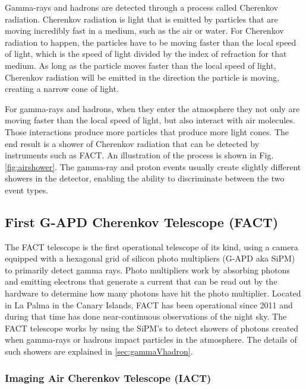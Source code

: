 \documentclass[12pt]{article}
\begin{document}
Gamma-rays and hadrons are detected through a process called Cherenkov radiation. Cherenkov radiation is light that is emitted by particles that are moving incredibly fast in a medium, such as the air or water. For Cherenkov radiation to happen, the particles have to be moving faster than the local speed of light, which is the speed of light divided by the index of refraction for that medium. As long as the particle moves faster than the local speed of light, Cherenkov radiation will be emitted in the direction the particle is moving, creating a narrow cone of light.

For gamma-rays and hadrons, when they enter the atmosphere they not only are moving faster than the local speed of light, but also interact with air molecules. Those interactions produce more particles that produce more light cones. The end result is a shower of Cherenkov radiation that can be detected by instruments such as FACT. An illustration of the process is shown in Fig. \ref{fig:airshower}. The gamma-ray and proton events usually create slightly different showers in the detector, enabling the ability to discriminate between the two event types. 



\subsection{First G-APD Cherenkov Telescope (FACT)}\label{sec:FACT}

The FACT telescope is the first operational telescope of its kind, using a camera equipped with a hexagonal grid of silicon photo multipliers (G-APD aka SiPM) to primarily detect gamma rays\cite{ANDERHUB2011107}. Photo multipliers work by absorbing photons and emitting electrons that generate a current that can be read out by the hardware to determine how many photons have hit the photo multiplier. Located in La Palma in the Canary Islands, FACT has been operational since 2011 and during that time has done near-continuous observations of the night sky. The FACT telescope works by using the SiPM's to detect showers of photons created when gamma-rays or hadrons impact particles in the atmosphere. The details of such showers are explained in \ref{sec:gammaVhadron}.

\subsubsection{Imaging Air Cherenkov Telescope (IACT)}\label{sec:cta}
\end{document}
